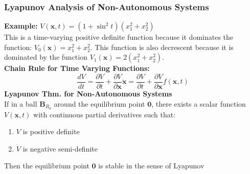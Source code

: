 \documentclass[11pt,handout]{beamer}   %
\begin{document}
\begin{frame}
\frametitle{Lyapunov Analysis of Non-Autonomous Systems}
\small
\textbf{Example:} $V(\mathbf{x},t) = ( 1 + \sin ^2 t)(x_1^2 + x_2^2)$\\
This is a time-varying positive definite function because it dominates the function: $V_0(\mathbf{x}) = x_1^2 + x_2^2$.  This function is also decrescent because it is dominated by the function $V_1(\mathbf{x}) = 2(x_1^2 + x_2^2)$.\\
\vspace{6pt}
\textbf{Chain Rule for Time Varying Functions:}
\begin{equation*}
\frac{d V}{d t} = \frac{\partial V}{\partial t} + \frac{\partial V}{\partial \mathbf{x}}\dot{\mathbf{x}} = \frac{\partial V}{\partial t} + \frac{\partial V}{\partial \mathbf{x}} f(\mathbf{x},t)
\end{equation*}
\textbf{Lyapunov Thm. for Non-Autonomous Systems}\\
If in a ball $\mathbf{B}_{R_0}$ around the equilibrium point $\mathbf{0}$, there exists a scalar function $V(\mathbf{x},t)$ with continuous partial derivatives such that:
\begin{enumerate}
\item $V$ is positive definite
\item $\dot{V}$ is negative semi-definite
\end{enumerate}
Then the equilibrium point $\mathbf{0}$ is stable in the sense of Lyapunov
\end{frame}
\end{document}

